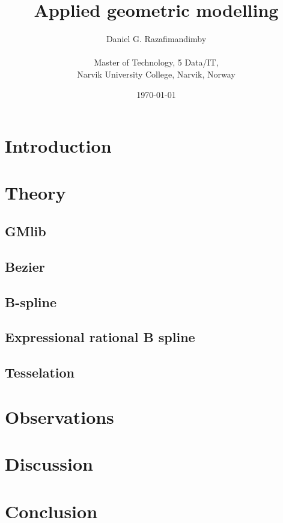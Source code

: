 \documentclass[a4paper,11pt]{article}
\title{Applied geometric modelling}
\author{
  Daniel G. Razafimandimby \\ \\
  Master of Technology, 5 Data/IT, \\
  Narvik University College, Narvik, Norway
}
\date{\today}
\begin{document}
\maketitle

\begin{abstract}

\end{abstract}


\section{Introduction}

\section{Theory}
\subsection{GMlib}
\subsection{Bezier}
\subsection{B-spline}
\subsection{Expressional rational B spline}
\subsection{Tesselation}

\section{Observations}

\section{Discussion}

\section{Conclusion}

%
%
\end{document}
